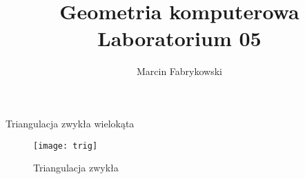 \documentclass[a4paper, 12pt]{article}
\author{Marcin Fabrykowski}
\title{Geometria komputerowa\\Laboratorium 05}
\begin{document}
\maketitle
\newpage
Triangulacja zwykła wielokąta

\begin{figure}
\texttt{[image: trig]}
\caption{Triangulacja zwykła}
\end{figure}
\end{document}
